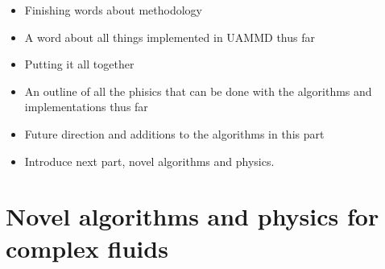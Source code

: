 \documentclass[ twoside,openright,titlepage,numbers=noenddot,%
headinclude,footinclude,cleardoublepage=empty,abstract=on,
BCOR=5mm,paper=a4,fontsize=11pt, dvipsnames
]{scrreprt}
\newcommand{\uammd}{\gls{UAMMD}\xspace}
\begin{document}
%
%



\begin{itemize}
\item Finishing words about methodology
\item A word about all things implemented in UAMMD thus far
\item Putting it all together
\item An outline of all the phisics that can be done with the algorithms and implementations thus far
\item Future direction and additions to the algorithms in this part
\item Introduce next part, novel algorithms and physics.
\end{itemize}

\cleardoublepage

\ctparttext{}
\part{Novel algorithms and physics for complex fluids}\label{pt:algo}
\end{document}
